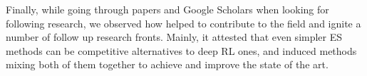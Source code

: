 \documentclass[10pt]{article} %
\begin{document}
Finally, while going through papers and Google Scholars when looking for following research, we observed how \cite{back-to-basics} helped to contribute to the field and ignite a number of follow up research fronts. Mainly, it attested that even simpler ES methods can be competitive alternatives to deep RL ones, and induced methods mixing both of them together to achieve and improve the state of the art.

{}

\end{document}
